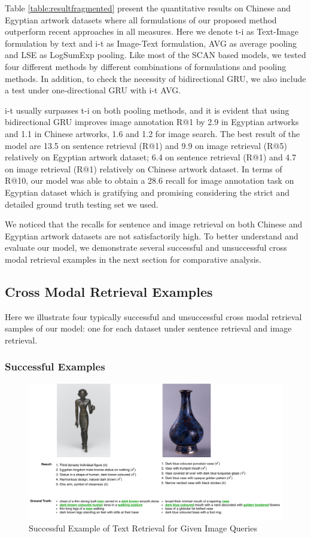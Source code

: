 Table \ref{table:resultfragmented} present the quantitative results on Chinese and Egyptian artwork datasets where all formulations of our proposed method outperform recent approaches in all measures. Here we denote t-i as Text-Image formulation by text and i-t as Image-Text formulation, AVG as average pooling and LSE as LogSumExp pooling. Like most of the SCAN based models, we tested four different methods by different combinations of formulations and pooling methods. In addition, to check the necessity of bidirectional GRU, we also include a test under one-directional GRU with i-t AVG.

i-t usually surpasses t-i on both pooling methods, and it is evident that using bidirectional GRU improves image annotation R@1 by 2.9 in Egyptian artworks and 1.1 in Chinese artworks, 1.6 and 1.2 for image search. The best result of the model are 13.5 on sentence retrieval (R@1) and 9.9 on image retrieval (R@5) relatively on Egyptian artwork dataset; 6.4 on sentence retrieval (R@1) and 4.7 on image retrieval (R@1) relatively on Chinese artwork dataset. In terms of R@10, our model was able to obtain a 28.6 recall for image annotation task on Egyptian dataset which is gratifying and promising considering the strict and detailed ground truth testing set we used.

We noticed that the recalls for sentence and image retrieval on both Chinese and Egyptian artwork datasets are not satisfactorily high. To better understand and evaluate our model, we demonstrate several successful and unsuccessful cross modal retrieval examples in the next section for comparative analysis.

\subsection{Cross Modal Retrieval Examples}
Here we illustrate four typically successful and unsuccessful cross modal retrieval samples of our model: one for each dataset under sentence retrieval and image retrieval. 

\subsubsection{Successful Examples}

\begin{figure}[h!]
\centering
\includegraphics[width=\textwidth]{i2t.pdf}
\caption{Successful Example of Text Retrieval for Given Image Queries}
\label{fig:i2t}
\end{figure}

